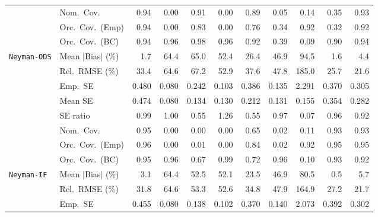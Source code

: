 \begin{landscape}
\begin{longtable}{llrrrrrrrrr}
 & Nom.\ Cov. & \cellcolor{rankone}0.94 & 0.00 & \cellcolor{rankthree}0.91 & 0.00 & 0.89 & 0.05 & 0.14 & 0.35 & \cellcolor{ranktwo}0.93 \\
 & Orc.\ Cov.\ (Emp) & \cellcolor{rankone}0.94 & 0.00 & \cellcolor{rankthree}0.83 & 0.00 & 0.76 & 0.34 & \cellcolor{ranktwo}0.92 & 0.32 & \cellcolor{ranktwo}0.92 \\
 & Orc.\ Cov.\ (BC) & \cellcolor{rankone}0.94 & \cellcolor{rankone}0.96 & \cellcolor{ranktwo}0.98 & \cellcolor{rankone}0.96 & \cellcolor{ranktwo}0.92 & 0.39 & 0.09 & \cellcolor{rankthree}0.90 & \cellcolor{rankone}0.94 \\
\addlinespace[2pt]
\quad \texttt{Neyman-ODS} & Mean $|$Bias$|$ (\%) & \cellcolor{ranktwo}1.7 & 64.4 & 65.0 & 52.4 & 26.4 & 46.9 & 94.5 & \cellcolor{rankone}1.6 & \cellcolor{rankthree}4.4 \\
 & Rel.\ RMSE (\%) & \cellcolor{rankthree}33.4 & 64.6 & 67.2 & 52.9 & 37.6 & 47.8 & 185.0 & \cellcolor{ranktwo}25.7 & \cellcolor{rankone}21.6 \\
 & Emp.\ SE & 0.480 & 0.080 & 0.242 & 0.103 & 0.386 & 0.135 & 2.291 & 0.370 & 0.305 \\
 & Mean SE & 0.474 & 0.080 & 0.134 & 0.130 & 0.212 & 0.131 & 0.155 & 0.354 & 0.282 \\
 & SE ratio & \cellcolor{ranktwo}0.99 & \cellcolor{rankone}1.00 & 0.55 & 1.26 & 0.55 & \cellcolor{rankthree}0.97 & 0.07 & 0.96 & 0.92 \\
 & Nom.\ Cov. & \cellcolor{rankone}0.95 & 0.00 & 0.00 & 0.00 & \cellcolor{rankthree}0.65 & 0.02 & 0.11 & \cellcolor{ranktwo}0.93 & \cellcolor{ranktwo}0.93 \\
 & Orc.\ Cov.\ (Emp) & \cellcolor{ranktwo}0.96 & 0.00 & 0.01 & 0.00 & 0.84 & 0.02 & \cellcolor{rankthree}0.92 & \cellcolor{rankone}0.95 & \cellcolor{rankone}0.95 \\
 & Orc.\ Cov.\ (BC) & \cellcolor{rankone}0.95 & \cellcolor{ranktwo}0.96 & 0.67 & 0.99 & 0.72 & \cellcolor{ranktwo}0.96 & 0.10 & \cellcolor{rankthree}0.93 & 0.92 \\
\addlinespace[2pt]
\quad \texttt{Neyman-IF} & Mean $|$Bias$|$ (\%) & \cellcolor{ranktwo}3.1 & 64.4 & 52.5 & 52.1 & 23.5 & 46.9 & 80.5 & \cellcolor{rankone}0.5 & \cellcolor{rankthree}5.7 \\
 & Rel.\ RMSE (\%) & \cellcolor{rankthree}31.8 & 64.6 & 53.3 & 52.6 & 34.8 & 47.9 & 164.9 & \cellcolor{ranktwo}27.2 & \cellcolor{rankone}21.7 \\
 & Emp.\ SE & 0.455 & 0.080 & 0.138 & 0.102 & 0.370 & 0.140 & 2.073 & 0.392 & 0.302 \\

\end{longtable}
\end{landscape}
